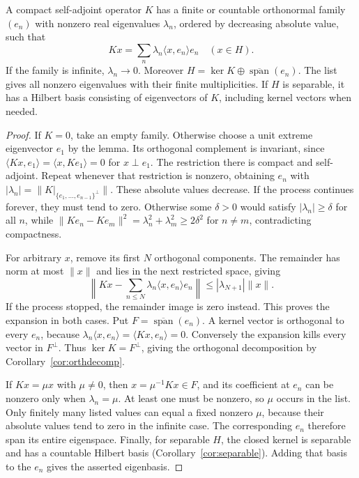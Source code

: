 \begin{theorem}\label{thm:spectralcompact}
A compact self-adjoint operator $K$ has a finite or countable orthonormal family $(e_n)$ with nonzero real eigenvalues $\lambda_n$, ordered by decreasing absolute value, such that
\[
Kx=\sum_n\lambda_n\langle x,e_n\rangle e_n\quad(x\in H).
\]
If the family is infinite, $\lambda_n\to0$. Moreover
$H=\ker K\oplus\overline{\operatorname{span}}(e_n)$.
The list gives all nonzero eigenvalues with their finite multiplicities. If $H$ is separable, it has a Hilbert basis consisting of eigenvectors of $K$, including kernel vectors when needed.
\end{theorem}
\begin{proof}
If $K=0$, take an empty family. Otherwise choose a unit extreme eigenvector $e_1$ by the lemma. Its orthogonal complement is invariant, since $\langle Kx,e_1\rangle=\langle x,Ke_1\rangle=0$ for $x\perp e_1$. The restriction there is compact and self-adjoint. Repeat whenever that restriction is nonzero, obtaining $e_n$ with
$|\lambda_n|=\|K|_{\{e_1,\ldots,e_{n-1}\}^\perp}\|$.
These absolute values decrease.
If the process continues forever, they must tend to zero. Otherwise some $\delta>0$ would satisfy $|\lambda_n|\ge\delta$ for all $n$, while
$\|Ke_n-Ke_m\|^2=\lambda_n^2+\lambda_m^2\ge2\delta^2$ for $n\ne m$, contradicting compactness.

For arbitrary $x$, remove its first $N$ orthogonal components. The remainder has norm at most $\|x\|$ and lies in the next restricted space, giving
\[
\left\|Kx-\sum_{n\le N}\lambda_n\langle x,e_n\rangle e_n\right\|
\le|\lambda_{N+1}|\|x\|.
\]
If the process stopped, the remainder image is zero instead. This proves the expansion in both cases.
Put $F=\overline{\operatorname{span}}(e_n)$. A kernel vector is orthogonal to every $e_n$, because $\lambda_n\langle x,e_n\rangle=\langle Kx,e_n\rangle=0$. Conversely the expansion kills every vector in $F^\perp$. Thus $\ker K=F^\perp$, giving the orthogonal decomposition by Corollary~\ref{cor:orthdecomp}.

If $Kx=\mu x$ with $\mu\ne0$, then $x=\mu^{-1}Kx\in F$, and its coefficient at $e_n$ can be nonzero only when $\lambda_n=\mu$. At least one must be nonzero, so $\mu$ occurs in the list. Only finitely many listed values can equal a fixed nonzero $\mu$, because their absolute values tend to zero in the infinite case. The corresponding $e_n$ therefore span its entire eigenspace. Finally, for separable $H$, the closed kernel is separable and has a countable Hilbert basis (Corollary~\ref{cor:separable}). Adding that basis to the $e_n$ gives the asserted eigenbasis.
\end{proof}


